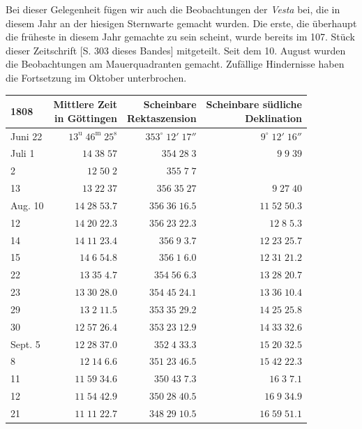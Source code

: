\par\indent Bei dieser Gelegenheit fügen wir auch die Beobachtungen der \emph{Vesta} bei, die in diesem Jahr an der hiesigen Sternwarte gemacht wurden. Die erste, die überhaupt die früheste in diesem Jahr gemachte zu sein scheint, wurde bereits im 107. Stück dieser Zeitschrift [S. 303 dieses Bandes] mitgeteilt. Seit dem 10. August wurden die Beobachtungen am Mauerquadranten gemacht. Zufällige Hindernisse haben die Fortsetzung im Oktober unterbrochen.


\begin{center}\fontsize{10}{12}\selectfont\setlength{\tabcolsep}{5pt}\renewcommand{\arraystretch}{1.15}\begin{tabular}{lrrr}
1808 & \shortstack{Mittlere Zeit\\in Göttingen} & \shortstack{Scheinbare\\Rektaszension} & \shortstack{Scheinbare südliche\\Deklination}\\
\hline
Juni 22 & $13^{\text{u}}\;46^{\text{m}}\;25^{\text{s}}$ & $353^\circ\;12'\;17''$ & $9^\circ\;12'\;16''$\\
Juli  1 & $14\;38\;57$ & $354\;28\;3$ & $9\;9\;39$\\
2 & $12\;50\;2$ & $355\;7\;7$ & \\
13 & $13\;22\;37$ & $356\;35\;27$ & $9\;27\;40$\\
Aug. 10 & $14\;28\;53.7$ & $356\;36\;16.5$ & $11\;52\;50.3$\\
12 & $14\;20\;22.3$ & $356\;23\;22.3$ & $12\;8\;5.3$\\
14 & $14\;11\;23.4$ & $356\;9\;3.7$ & $12\;23\;25.7$\\
15 & $14\;6\;54.8$ & $356\;1\;6.0$ & $12\;31\;21.2$\\
22 & $13\;35\;4.7$ & $354\;56\;6.3$ & $13\;28\;20.7$\\
23 & $13\;30\;28.0$ & $354\;45\;24.1$ & $13\;36\;10.4$\\
29 & $13\;2\;11.5$ & $353\;35\;29.2$ & $14\;25\;25.8$\\
30 & $12\;57\;26.4$ & $353\;23\;12.9$ & $14\;33\;32.6$\\
Sept. 5 & $12\;28\;37.0$ & $352\;4\;33.3$ & $15\;20\;32.5$\\
8 & $12\;14\;6.6$ & $351\;23\;46.5$ & $15\;42\;22.3$\\
11 & $11\;59\;34.6$ & $350\;43\;7.3$ & $16\;3\;7.1$\\
12 & $11\;54\;42.9$ & $350\;28\;40.5$ & $16\;9\;34.9$\\
21 & $11\;11\;22.7$ & $348\;29\;10.5$ & $16\;59\;51.1$\\
\end{tabular}\end{center}


